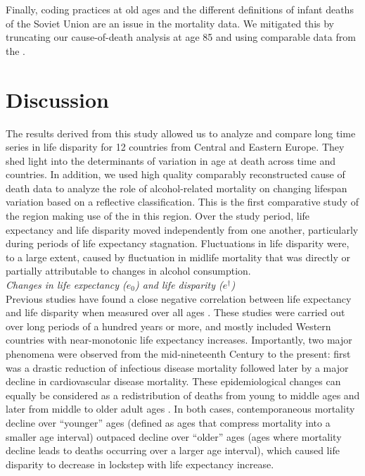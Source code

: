 \documentclass{article}
\begin{document}
\begin{spacing}{1.5}
Finally, coding practices at old ages and the different definitions of infant deaths of the Soviet Union are an issue in the mortality data. We mitigated this by truncating our cause-of-death analysis at age 85 and using comparable data from the \cite{HcO}. \\

\section*{Discussion}
The results derived from this study allowed us to analyze and compare long time series in life disparity for 12 countries from Central and Eastern Europe. They shed light into the determinants of variation in age at death across time and countries. In addition, we used high quality comparably reconstructed cause of death data to analyze the role of alcohol-related mortality on changing lifespan variation based on a reflective classification. This is the first comparative study of the region making use of the \citet{HcO} in this region. Over the study period, life expectancy and life disparity moved independently from one another, particularly during periods of life expectancy stagnation. Fluctuations in life disparity were, to a large extent, caused by fluctuation in midlife mortality that was directly or partially attributable to changes in alcohol consumption. \\
 
\emph{Changes in life expectancy ($e_0$) and life disparity ($e^\dagger$)}\\

Previous studies have found a close negative correlation between life expectancy and life disparity when measured over all ages  \citep{ wilmoth1999,vaupel2011,colchero2016emergence}. These studies were carried out over long periods of a hundred years or more, and mostly included Western countries with near-monotonic life expectancy increases. Importantly, two major phenomena were observed from the mid-nineteenth Century to the present: first was a drastic reduction of infectious disease mortality followed later by a major decline in cardiovascular disease mortality. These epidemiological changes can equally be considered as a redistribution of deaths from young to middle ages and later from middle to older adult ages \citep{robine2001redefining}. In both cases, contemporaneous mortality decline over ``younger'' ages (defined as ages that compress mortality into a smaller age interval) outpaced decline over ``older'' ages (ages where mortality decline leads to deaths occurring over a larger age interval), which caused life disparity to decrease in lockstep with life expectancy increase.\\


\end{spacing}
\end{document}

